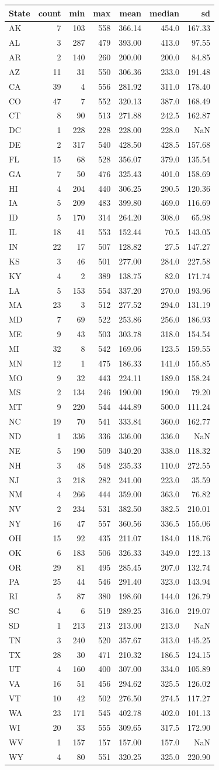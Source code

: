 \documentclass[]{article}
\begin{document}
\begin{longtable}[]{@{}lrrrrrr@{}}
\toprule
State & count & min & max & mean & median & sd\tabularnewline
\midrule
\endhead
AK & 7 & 103 & 558 & 366.14 & 454.0 & 167.33\tabularnewline
AL & 3 & 287 & 479 & 393.00 & 413.0 & 97.55\tabularnewline
AR & 2 & 140 & 260 & 200.00 & 200.0 & 84.85\tabularnewline
AZ & 11 & 31 & 550 & 306.36 & 233.0 & 191.48\tabularnewline
CA & 39 & 4 & 556 & 281.92 & 311.0 & 178.40\tabularnewline
CO & 47 & 7 & 552 & 320.13 & 387.0 & 168.49\tabularnewline
CT & 8 & 90 & 513 & 271.88 & 242.5 & 162.87\tabularnewline
DC & 1 & 228 & 228 & 228.00 & 228.0 & NaN\tabularnewline
DE & 2 & 317 & 540 & 428.50 & 428.5 & 157.68\tabularnewline
FL & 15 & 68 & 528 & 356.07 & 379.0 & 135.54\tabularnewline
GA & 7 & 50 & 476 & 325.43 & 401.0 & 158.69\tabularnewline
HI & 4 & 204 & 440 & 306.25 & 290.5 & 120.36\tabularnewline
IA & 5 & 209 & 483 & 399.80 & 469.0 & 116.69\tabularnewline
ID & 5 & 170 & 314 & 264.20 & 308.0 & 65.98\tabularnewline
IL & 18 & 41 & 553 & 152.44 & 70.5 & 143.05\tabularnewline
IN & 22 & 17 & 507 & 128.82 & 27.5 & 147.27\tabularnewline
KS & 3 & 46 & 501 & 277.00 & 284.0 & 227.58\tabularnewline
KY & 4 & 2 & 389 & 138.75 & 82.0 & 171.74\tabularnewline
LA & 5 & 153 & 554 & 337.20 & 270.0 & 193.96\tabularnewline
MA & 23 & 3 & 512 & 277.52 & 294.0 & 131.19\tabularnewline
MD & 7 & 69 & 522 & 253.86 & 256.0 & 186.93\tabularnewline
ME & 9 & 43 & 503 & 303.78 & 318.0 & 154.54\tabularnewline
MI & 32 & 8 & 542 & 169.06 & 123.5 & 159.55\tabularnewline
MN & 12 & 1 & 475 & 186.33 & 141.0 & 155.85\tabularnewline
MO & 9 & 32 & 443 & 224.11 & 189.0 & 158.24\tabularnewline
MS & 2 & 134 & 246 & 190.00 & 190.0 & 79.20\tabularnewline
MT & 9 & 220 & 544 & 444.89 & 500.0 & 111.24\tabularnewline
NC & 19 & 70 & 541 & 333.84 & 360.0 & 162.77\tabularnewline
ND & 1 & 336 & 336 & 336.00 & 336.0 & NaN\tabularnewline
NE & 5 & 190 & 509 & 340.20 & 338.0 & 118.32\tabularnewline
NH & 3 & 48 & 548 & 235.33 & 110.0 & 272.55\tabularnewline
NJ & 3 & 218 & 282 & 241.00 & 223.0 & 35.59\tabularnewline
NM & 4 & 266 & 444 & 359.00 & 363.0 & 76.82\tabularnewline
NV & 2 & 234 & 531 & 382.50 & 382.5 & 210.01\tabularnewline
NY & 16 & 47 & 557 & 360.56 & 336.5 & 155.06\tabularnewline
OH & 15 & 92 & 435 & 211.07 & 184.0 & 118.76\tabularnewline
OK & 6 & 183 & 506 & 326.33 & 349.0 & 122.13\tabularnewline
OR & 29 & 81 & 495 & 285.45 & 207.0 & 132.74\tabularnewline
PA & 25 & 44 & 546 & 291.40 & 323.0 & 143.94\tabularnewline
RI & 5 & 87 & 380 & 198.60 & 144.0 & 126.79\tabularnewline
SC & 4 & 6 & 519 & 289.25 & 316.0 & 219.07\tabularnewline
SD & 1 & 213 & 213 & 213.00 & 213.0 & NaN\tabularnewline
TN & 3 & 240 & 520 & 357.67 & 313.0 & 145.25\tabularnewline
TX & 28 & 30 & 471 & 210.32 & 186.5 & 124.15\tabularnewline
UT & 4 & 160 & 400 & 307.00 & 334.0 & 105.89\tabularnewline
VA & 16 & 51 & 456 & 294.62 & 325.5 & 126.02\tabularnewline
VT & 10 & 42 & 502 & 276.50 & 274.5 & 117.27\tabularnewline
WA & 23 & 171 & 545 & 402.78 & 402.0 & 101.13\tabularnewline
WI & 20 & 33 & 555 & 309.65 & 317.5 & 172.90\tabularnewline
WV & 1 & 157 & 157 & 157.00 & 157.0 & NaN\tabularnewline
WY & 4 & 80 & 551 & 320.25 & 325.0 & 220.90\tabularnewline
\bottomrule
\end{longtable}
\end{document}
